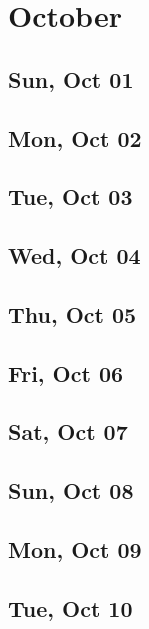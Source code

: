 \chapter{October}
	\section{Sun, Oct 01}
		
	\section{Mon, Oct 02}
		
	\section{Tue, Oct 03}
		
	\section{Wed, Oct 04}
		
	\section{Thu, Oct 05}
		
	\section{Fri, Oct 06}
		
	\section{Sat, Oct 07}
		
	\section{Sun, Oct 08}
		
	\section{Mon, Oct 09}
		
	\section{Tue, Oct 10}
		
